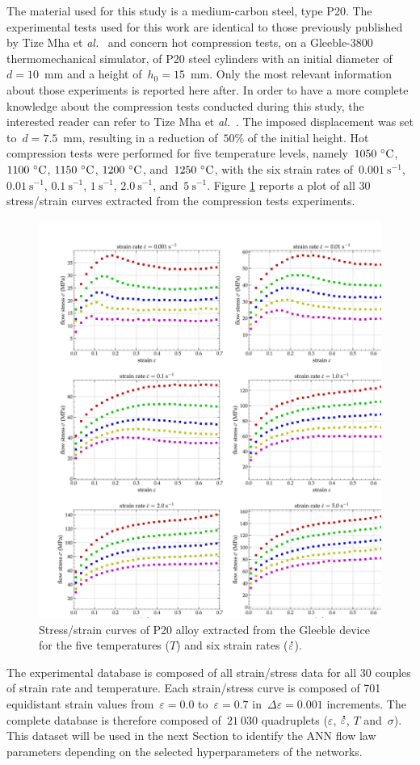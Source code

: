 \documentclass[algorithms,article,submit,pdftex,oneauthors]{Definitions/mdpi}
\makeatletter
\DeclareRobustCommand{\mdot}[1]{\accentset{\mbox{\bfseries .}}{#1}}
\DeclareRobustCommand{\eal}{et \emph{al.}\@\xspace}
\DeclareRobustCommand{\ps}{\text{s}^{-1}}
\makeatother
\begin{document}
The material used for this study is a medium-carbon steel, type P20.
The experimental tests used for this work are identical to those previously published by Tize Mha \eal~\cite{Tize-2023-IEP} and concern hot compression tests, on a Gleeble-3800 thermomechanical simulator, of P20 steel cylinders with an initial diameter of~$d=10$~mm and a height of~$h_0=15$~mm.
Only the most relevant information about those experiments is reported here after.
In order to have a more complete knowledge about the compression tests conducted during this study, the interested reader can refer to Tize Mha \eal~\cite{Tize-2023-IEP}.
The imposed displacement was set to~$d=7.5$~mm, resulting in a reduction of~$50\%$ of the initial height.
Hot compression tests were performed for five temperature levels, namely~$1050~\celsius$, $1100~\celsius$, $1150~\celsius$, $1200~\celsius$, and~$1250~\celsius$, with the six strain rates of~$0.001~\ps$, $0.01~\ps$, $0.1~\ps$, $1~\ps$, $2.0~\ps$, and~$5~\ps$.
Figure \ref{fig:RawData} reports a plot of all 30 stress/strain curves extracted from the compression tests experiments.
\begin{figure}[h!]
\centering
\includegraphics[width=0.9\columnwidth]{Figures/3Cr2Mo-raw}
\caption{Stress/strain curves of P20 alloy extracted from the Gleeble device for the five temperatures ($T$) and six strain rates ($\mdot{\varepsilon}$).}
\label{fig:RawData}
\end{figure}
The experimental database is composed of all strain/stress data for all 30 couples of strain rate and temperature.
Each strain/stress curve is composed of 701 equidistant strain values from~$\varepsilon=0.0$ to~$\varepsilon=0.7$ in~$\Delta\varepsilon=0.001$ increments.
The complete database is therefore composed of~$21~030$ quadruplets ($\varepsilon$, $\mdot{\varepsilon}$, $T$ and~$\sigma$).
This dataset will be used in the next Section to identify the ANN flow law parameters depending on the selected hyperparameters of the networks.
\end{document}
